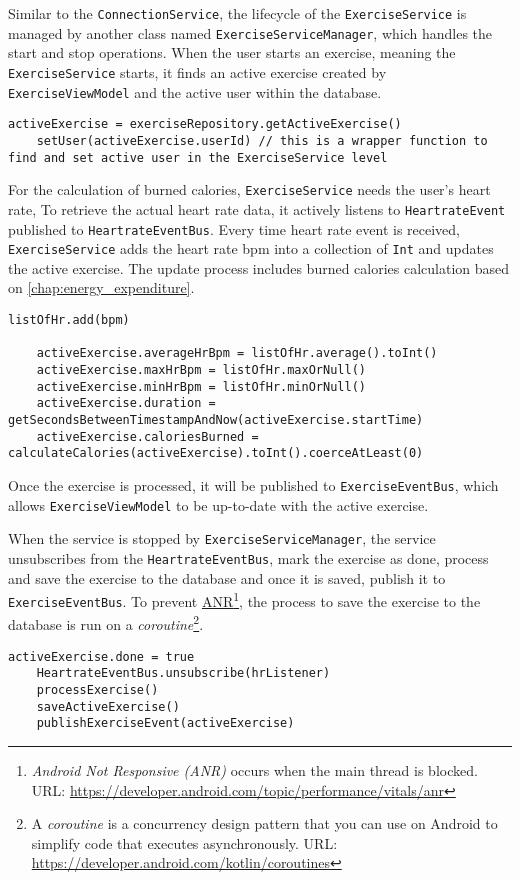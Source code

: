 Similar to the \verb;ConnectionService;, the lifecycle of the \verb;ExerciseService; is managed by another class named \verb;ExerciseServiceManager;, which handles the start and stop operations. 
When the user starts an exercise, meaning the \texttt{ExerciseService} starts, it finds an active exercise created by \texttt{ExerciseViewModel} and the active user within the database. 
\begin{lstlisting}[caption={On ExerciseService started (Kotlin - ExerciseService)}]
    activeExercise = exerciseRepository.getActiveExercise()
    setUser(activeExercise.userId) // this is a wrapper function to find and set active user in the ExerciseService level
\end{lstlisting}

For the calculation of burned calories, \verb;ExerciseService; needs the user's heart rate, To retrieve the actual heart rate data, it actively listens to \verb;HeartrateEvent; published to \verb;HeartrateEventBus;.
Every time heart rate event is received, \verb;ExerciseService; adds the heart rate bpm into a collection of \verb;Int; and updates the active exercise. The update process includes burned calories calculation based on \autoref{chap:energy_expenditure}. 
\begin{lstlisting}[caption={Process active exercise snippet (Kotlin - ExerciseService)}]
    listOfHr.add(bpm)

    activeExercise.averageHrBpm = listOfHr.average().toInt()
    activeExercise.maxHrBpm = listOfHr.maxOrNull()
    activeExercise.minHrBpm = listOfHr.minOrNull()
    activeExercise.duration = getSecondsBetweenTimestampAndNow(activeExercise.startTime)
    activeExercise.caloriesBurned = calculateCalories(activeExercise).toInt().coerceAtLeast(0)
\end{lstlisting}

Once the exercise is processed, it will be published to \verb;ExerciseEventBus;, which allows \verb;ExerciseViewModel; to be up-to-date with the active exercise.

When the service is stopped by \verb;ExerciseServiceManager;, the service unsubscribes from the \verb;HeartrateEventBus;, mark the exercise as done, process and save the exercise to the database and once it is saved, publish it to \verb;ExerciseEventBus;.
To prevent \url{ANR}\footnote{\emph{Android Not Responsive (ANR)} occurs when the main thread is blocked. URL: \url{https://developer.android.com/topic/performance/vitals/anr}}, the process to save the exercise to the database is run on a \emph{coroutine}\footnote{A \emph{coroutine} is a concurrency design pattern that you can use on Android to simplify code that executes asynchronously. URL: \url{https://developer.android.com/kotlin/coroutines}}.
\begin{lstlisting}[caption={On exercise stopped snippet (Kotlin - ExerciseService)}]
    activeExercise.done = true
    HeartrateEventBus.unsubscribe(hrListener)
    processExercise()
    saveActiveExercise()
    publishExerciseEvent(activeExercise)
\end{lstlisting}